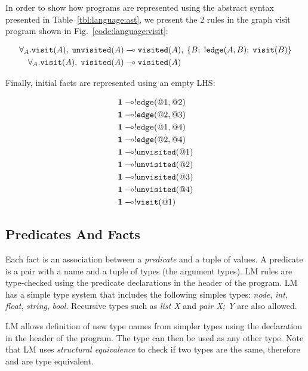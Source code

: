 In order to show how programs are represented using the abstract syntax
presented in Table~\ref{tbl:language:ast}, we present the 2 rules in the graph
visit program shown in Fig.~\ref{code:language:visit}:

\nopagebreak

\begin{align}
\forall_A. \mathtt{visit}(A), \; \mathtt{unvisited}(A) \multimap & \;
\mathtt{visited}(A), \; \{ B; \; {!} \mathtt{edge}(A, B); \;
\mathtt{visit}(B)\}\\
\forall_A. \mathtt{visit}(A), \; \mathtt{visited}(A) \multimap & \;
\mathtt{visited}(A)
\end{align}

Finally, initial facts are represented using an empty LHS:

\nopagebreak

\begin{align}
\mathbf{1} \multimap & {!} \mathtt{edge}(@1, @2) \\
\mathbf{1} \multimap & {!} \mathtt{edge}(@2, @3) \\
\mathbf{1} \multimap & {!} \mathtt{edge}(@1, @4) \\
\mathbf{1} \multimap & {!} \mathtt{edge}(@2, @4) \\
\mathbf{1} \multimap & {!} \mathtt{unvisited}(@1)  \\
\mathbf{1} \multimap & {!} \mathtt{unvisited}(@2) \\
\mathbf{1} \multimap & {!} \mathtt{unvisited}(@3) \\
\mathbf{1} \multimap & {!} \mathtt{unvisited}(@4) \\
\mathbf{1} \multimap & {!} \mathtt{visit}(@1)
\end{align}

\subsection{Predicates And Facts}

Each fact is an association between a \emph{predicate} and a tuple of values. A
predicate is a pair with a name and a tuple of types (the argument types). LM
rules are type-checked using the predicate declarations in the header of the
program. LM has a simple type system that includes the following simples types:
\emph{node}, \emph{int}, \emph{float}, \emph{string}, \emph{bool}. Recursive
types such as \emph{list X} and \emph{pair X; Y} are also allowed.

LM allows definition of new type names from simpler types using the declaration
 in the header of the program. The type
 can then be used as any other type. Note that LM uses
\emph{structural equivalence} to check if two types are the same, therefore
 and  are type equivalent.

